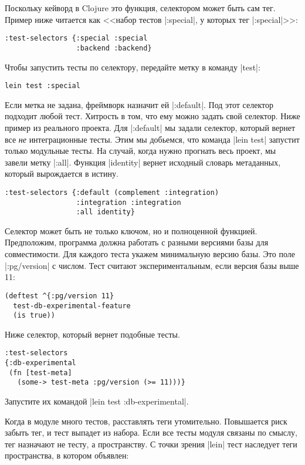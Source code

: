 Поскольку кейворд в Clojure это функция, селектором может быть сам тег. Пример
ниже читается как <<набор тестов \spverb|:special|, у которых тег
\spverb|:special|>>:

\begin{verbatim}
:test-selectors {:special :special
                 :backend :backend}
\end{verbatim}

Чтобы запустить тесты по селектору, передайте метку в команду \spverb|test|:

\begin{verbatim}
lein test :special
\end{verbatim}

Если метка не задана, фреймворк назначит ей \spverb|:default|. Под этот селектор
подходит любой тест. Хитрость в том, что ему можно задать свой селектор. Ниже
пример из реального проекта. Для \spverb|:default| мы задали селектор, который
вернет все \emph{не} интеграционные тесты. Этим мы добьемся, что команда
\spverb|lein test| запустит только модульные тесты. На случай, когда нужно
прогнать весь проект, мы завели метку \spverb|:all|. Функция \spverb|identity|
вернет исходный словарь метаданных, который вырождается в истину.

\begin{verbatim}
:test-selectors {:default (complement :integration)
                 :integration :integration
                 :all identity}
\end{verbatim}

Селектор может быть не только ключом, но и полноценной функцией. Предположим,
программа должна работать с разными версиями базы для совместимости. Для каждого
теста укажем минимальную версию базы. Это поле \spverb|:pg/version| с
числом. Тест считают экспериментальным, если версия базы выше 11:

\begin{verbatim}
(deftest ^{:pg/version 11}
  test-db-experimental-feature
  (is true))
\end{verbatim}

Ниже селектор, который вернет подобные тесты.

\begin{verbatim}
:test-selectors
{:db-experimental
 (fn [test-meta]
   (some-> test-meta :pg/version (>= 11)))}
\end{verbatim}

Запустите их командой \spverb|lein test :db-experimental|.

Когда в модуле много тестов, расставлять теги утомительно. Повышается риск
забыть тег, и тест выпадет из набора. Если все тесты модуля связаны по смыслу,
тег назначают не тесту, а пространству. С точки зрения \spverb|lein| тест
наследует теги пространства, в котором объявлен:

